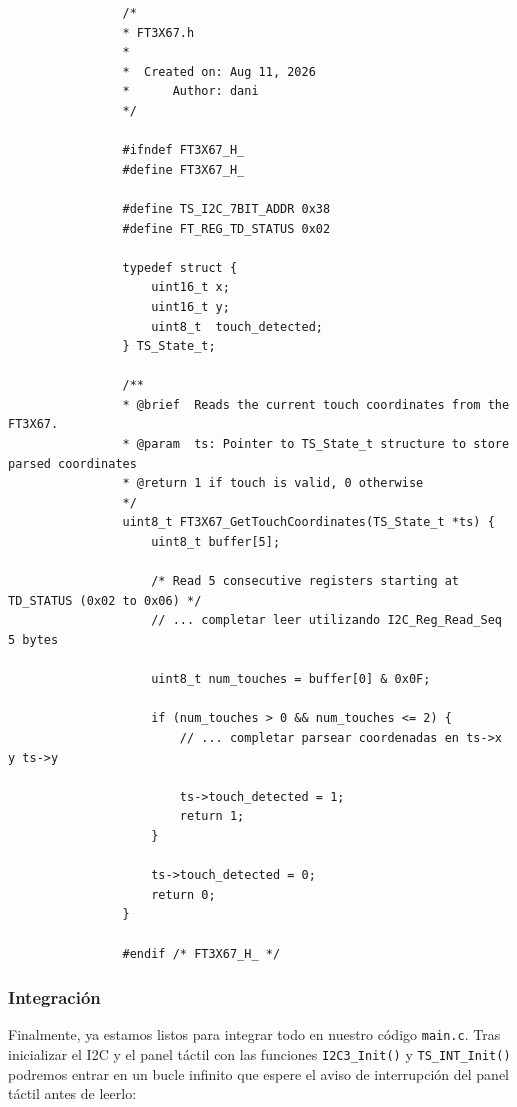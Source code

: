 \documentclass[../main.tex]{subfiles}
\begin{document}
            \begin{lstlisting}
                /*
                * FT3X67.h
                *
                *  Created on: Aug 11, 2026
                *      Author: dani
                */

                #ifndef FT3X67_H_
                #define FT3X67_H_

                #define TS_I2C_7BIT_ADDR 0x38
                #define FT_REG_TD_STATUS 0x02

                typedef struct {
                    uint16_t x;
                    uint16_t y;
                    uint8_t  touch_detected;
                } TS_State_t;

                /**
                * @brief  Reads the current touch coordinates from the FT3X67.
                * @param  ts: Pointer to TS_State_t structure to store parsed coordinates
                * @return 1 if touch is valid, 0 otherwise
                */
                uint8_t FT3X67_GetTouchCoordinates(TS_State_t *ts) {
                    uint8_t buffer[5];

                    /* Read 5 consecutive registers starting at TD_STATUS (0x02 to 0x06) */
                    // ... completar leer utilizando I2C_Reg_Read_Seq 5 bytes

                    uint8_t num_touches = buffer[0] & 0x0F;

                    if (num_touches > 0 && num_touches <= 2) {
                        // ... completar parsear coordenadas en ts->x y ts->y

                        ts->touch_detected = 1;
                        return 1;
                    }

                    ts->touch_detected = 0;
                    return 0;
                }

                #endif /* FT3X67_H_ */
            \end{lstlisting}

        \subsubsection{Integración}
            Finalmente, ya estamos listos para integrar todo en nuestro código \texttt{main.c}. Tras inicializar el I2C y el panel táctil con las funciones \texttt{I2C3\_Init()} y \texttt{TS\_INT\_Init()} podremos entrar en un bucle infinito que espere el aviso de interrupción del panel táctil antes de leerlo:
\end{document}
